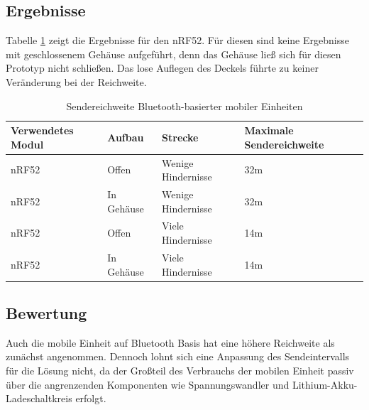 \subsection{Ergebnisse}
Tabelle \ref{table:rangeblue} zeigt die Ergebnisse für den nRF52.
Für diesen sind keine Ergebnisse mit geschlossenem Gehäuse aufgeführt, denn das Gehäuse ließ sich für diesen Prototyp nicht schließen.
Das lose Auflegen des Deckels führte zu keiner Veränderung bei der Reichweite.

\begin{table}[h]
	\centering
	\caption{Sendereichweite Bluetooth-basierter mobiler Einheiten}
	\label{table:rangeblue}
	\begin{tabular}{p{3.5cm}|p{3cm}|p{3.5cm}|p{3cm}}
		Verwendetes Modul & Aufbau & Strecke & Maximale Sendereichweite \\
		\hline
		nRF52 & Offen & Wenige Hindernisse & 32m \\
		nRF52 & In Gehäuse & Wenige Hindernisse & 32m \\
		nRF52 & Offen & Viele Hindernisse & 14m \\
		nRF52 & In Gehäuse & Viele Hindernisse & 14m \\
	\end{tabular}
\end{table}

\subsection{Bewertung}
Auch die mobile Einheit auf Bluetooth Basis hat eine höhere Reichweite als zunächst angenommen. 
Dennoch lohnt sich eine Anpassung des Sendeintervalls für die Lösung nicht, da der Großteil des Verbrauchs der mobilen Einheit passiv über die angrenzenden Komponenten wie Spannungswandler und Lithium-Akku-Ladeschaltkreis erfolgt.

